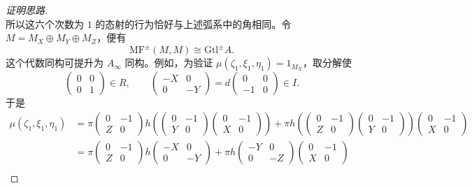 \begin{proof}[证明思路]
\[\]
所以这六个次数为 $1$ 的态射的行为恰好与上述弧系中的角相同。令 $M=M_X\oplus M_Y\oplus M_Z$，便有
\[
  \mathrm{MF}^{\pm}(M,M)\cong\mathrm{Gtl}^{\pm}A.
\]
这个代数同构可提升为 $A_\infty$ 同构。例如，为验证 $\mu(\zeta_1,\xi_1,\eta_1)=1_{M_X}$，取分解使
\[
  \begin{pmatrix}0&0\\0&1\end{pmatrix}\in R,
  \qquad
  \begin{pmatrix}-X&0\\0&-Y\end{pmatrix}
  =d\begin{pmatrix}0&0\\-1&0\end{pmatrix}\in I.
\]
于是
\[
\begin{aligned}
  \mu(\zeta_1,\xi_1,\eta_1)
  &=\pi\begin{pmatrix}0&-1\\Z&0\end{pmatrix}
    h\!\left(\begin{pmatrix}0&-1\\Y&0\end{pmatrix}
             \begin{pmatrix}0&-1\\X&0\end{pmatrix}\right)
   +\pi h\!\left(\begin{pmatrix}0&-1\\Z&0\end{pmatrix}
             \begin{pmatrix}0&-1\\Y&0\end{pmatrix}\right)
             \begin{pmatrix}0&-1\\X&0\end{pmatrix}\\
  &=\pi\begin{pmatrix}0&-1\\Z&0\end{pmatrix}
    h\begin{pmatrix}-X&0\\0&-Y\end{pmatrix}
   +\pi h\begin{pmatrix}-Y&0\\0&-Z\end{pmatrix}
             \begin{pmatrix}0&-1\\X&0\end{pmatrix}\\

\end{aligned}\]
\end{proof}
